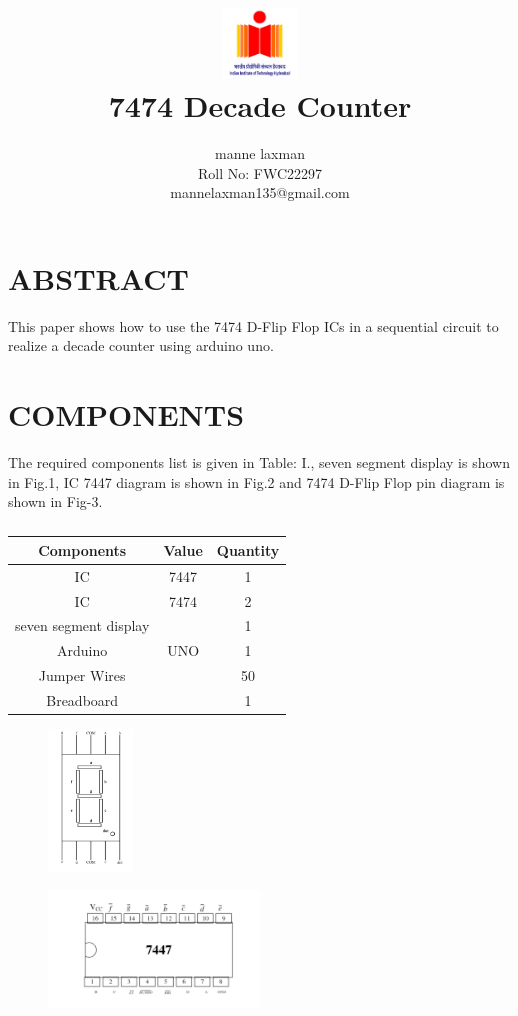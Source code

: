 \documentclass[conference]{IEEEtran}
\title{
\vspace{1cm}
{\includegraphics[width=0.15\textwidth]{iith.jpg} \\ 7474 Decade Counter} }
\author{manne laxman\\ Roll No: FWC22297 \\ mannelaxman135@gmail.com}
\begin{document}
\maketitle
 \section {ABSTRACT}
 This paper shows how to use the 7474 D-Flip Flop ICs in a sequential circuit to realize a decade counter using arduino uno.

\section{COMPONENTS}
The required components list is given in Table: I., seven segment display is shown in Fig.1, IC 7447 diagram is shown in Fig.2 and 7474 D-Flip Flop pin diagram is shown in Fig-3.
\vspace{0.3cm}
 \begin{table} [htbp]
\centering
\begin{tabular}{| c | c | c |} \hline
Components & Value & Quantity \\\hline
IC & 7447 & 1 \\ \hline
IC & 7474 & 2 \\ \hline
seven segment display & & 1\\ \hline
Arduino & UNO & 1 \\ \hline
Jumper Wires &  & 50 \\ \hline
Breadboard & & 1 \\
\hline
\end{tabular}
\vspace{0.3cm}
\caption{\label{tab:widgets}}
\end{table}

\begin{figure}[h]
\centering
\includegraphics[width=0.2\textwidth]{seg.jpg}
\caption{\label{fig-1:Gates}}
\end{figure}
\begin{figure}[h]
\centering
\includegraphics[width=0.5\textwidth]{imm.jpg}
\caption{\label{fig-2:Gates}}
\end{figure}
\end{document}

